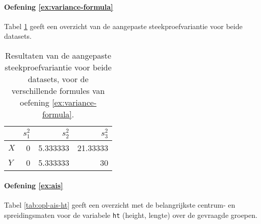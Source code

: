 \paragraph{Oefening \ref{ex:variance-formula}}
Tabel \ref{tab:opl-variance-ht} geeft een overzicht van de aangepaste steekproefvariantie voor beide datasets.

\begin{table}
  \centering
  \begin{tabular}{@{}l|rrr@{}}
    \toprule
      & \textbf{$s^{2}_{1}$} & \textbf{$s^{2}_{2}$} & \textbf{$s^{2}_{3}$} \\
    \midrule                
      \textbf{$ X $} & 0           & 5.333333    & 21.33333    \\ 
      \textbf{$ Y $} & 0           & 5.333333    & 30          \\           
    \bottomrule
  \end{tabular}
  \caption{Resultaten van de aangepaste steekproefvariantie voor beide datasets, voor de verschillende formules van oefening \ref{ex:variance-formula}.}
  \label{tab:opl-variance-ht}
\end{table}

\paragraph{Oefening \ref{ex:ais}}

Tabel \ref{tab:opl-ais-ht} geeft een overzicht met de belangrijkste centrum- en spreidingsmaten voor de variabele \texttt{ht} (height, lengte) over de gevraagde groepen.

